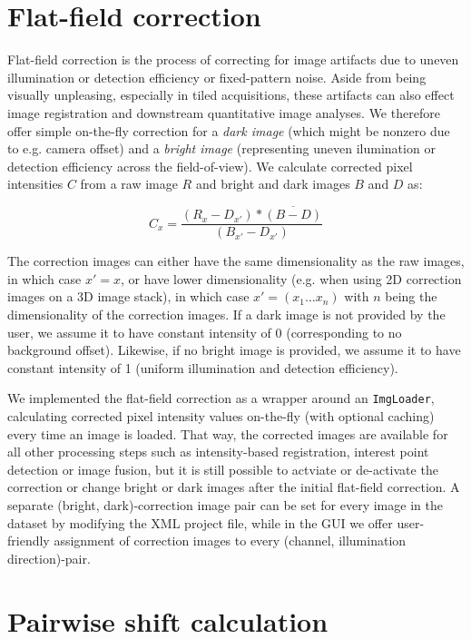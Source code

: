 \section{Flat-field correction}

Flat-field correction is the process of correcting for image artifacts due to uneven illumination or detection efficiency or fixed-pattern noise. Aside from being visually unpleasing, especially in tiled acquisitions, these artifacts can also effect image registration and downstream quantitative image analyses. We therefore offer simple on-the-fly correction for a \emph{dark image} (which might be nonzero due to e.g. camera offset) and a \emph{bright image} (representing uneven ilumination or detection efficiency across the field-of-view). We calculate corrected pixel intensities $C$ from a raw image $R$ and bright and dark images $B$ and $D$ as:

\begin{equation}
\label{eq:flatfield-eq1}
C_{x} = \frac{(R_{x} - D_{x'}) * \overline{(B-D)} }{(B_{x'}- D_{x'})}
\end{equation}

The correction images can either have the same dimensionality as the raw images, in which case $x' = x$, or have lower dimensionality (e.g. when using 2D correction images on a 3D image stack), in which case $x' = (x_1 \hdots x_n)$ with $n$ being the dimensionality of the correction images. If a dark image is not provided by the user, we assume it to have constant intensity of 0 (corresponding to no background offset). Likewise, if no bright image is provided, we assume it to have constant intensity of 1 (uniform illumination and detection efficiency). 

We implemented the flat-field correction as a wrapper around an \texttt{ImgLoader}, calculating corrected pixel intensity values on-the-fly (with optional caching) every time an image is loaded. That way, the corrected images are available for all other processing steps such as intensity-based registration, interest point detection or image fusion, but it is still possible to actviate or de-activate the correction or change bright or dark images after the initial flat-field correction. A separate (bright, dark)-correction image pair can be set for every image in the dataset by modifying the XML project file, while in the GUI we offer user-friendly assignment of correction images to every (channel, illumination direction)-pair.

\section{Pairwise shift calculation}

